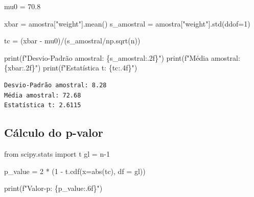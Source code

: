 \documentclass[
  letterpaper,
  DIV=11,
  numbers=noendperiod]{scrreprt}
\newenvironment{Shaded}{\begin{snugshade}}{\end{snugshade}}
\newcommand{\BuiltInTok}[1]{\textcolor[rgb]{0.00,0.23,0.31}{#1}}
\newcommand{\DecValTok}[1]{\textcolor[rgb]{0.68,0.00,0.00}{#1}}
\newcommand{\FloatTok}[1]{\textcolor[rgb]{0.68,0.00,0.00}{#1}}
\newcommand{\ImportTok}[1]{\textcolor[rgb]{0.00,0.46,0.62}{#1}}
\newcommand{\NormalTok}[1]{\textcolor[rgb]{0.00,0.23,0.31}{#1}}
\newcommand{\OperatorTok}[1]{\textcolor[rgb]{0.37,0.37,0.37}{#1}}
\newcommand{\SpecialCharTok}[1]{\textcolor[rgb]{0.37,0.37,0.37}{#1}}
\newcommand{\SpecialStringTok}[1]{\textcolor[rgb]{0.13,0.47,0.30}{#1}}
\newcommand{\StringTok}[1]{\textcolor[rgb]{0.13,0.47,0.30}{#1}}
\begin{document}
\begin{Shaded}
\begin{Highlighting}[]
\NormalTok{mu0 }\OperatorTok{=} \FloatTok{70.8} 

\NormalTok{xbar }\OperatorTok{=}\NormalTok{ amostra[}\StringTok{"weight"}\NormalTok{].mean() }
\NormalTok{s\_amostral }\OperatorTok{=}\NormalTok{ amostra[}\StringTok{"weight"}\NormalTok{].std(ddof}\OperatorTok{=}\DecValTok{1}\NormalTok{)}

\NormalTok{tc }\OperatorTok{=}\NormalTok{ (xbar }\OperatorTok{{-}}\NormalTok{ mu0)}\OperatorTok{/}\NormalTok{(s\_amostral}\OperatorTok{/}\NormalTok{np.sqrt(n)) }

\BuiltInTok{print}\NormalTok{(}\SpecialStringTok{f"Desvio{-}Padrão amostral: }\SpecialCharTok{\{}\NormalTok{s\_amostral}\SpecialCharTok{:.2f\}}\SpecialStringTok{"}\NormalTok{)}
\BuiltInTok{print}\NormalTok{(}\SpecialStringTok{f"Média amostral: }\SpecialCharTok{\{}\NormalTok{xbar}\SpecialCharTok{:.2f\}}\SpecialStringTok{"}\NormalTok{) }
\BuiltInTok{print}\NormalTok{(}\SpecialStringTok{f"Estatística t: }\SpecialCharTok{\{}\NormalTok{tc}\SpecialCharTok{:.4f\}}\SpecialStringTok{"}\NormalTok{)}
\end{Highlighting}
\end{Shaded}

\begin{verbatim}
Desvio-Padrão amostral: 8.28
Média amostral: 72.68
Estatística t: 2.6115
\end{verbatim}

\subsection{Cálculo do p-valor}\label{cuxe1lculo-do-p-valor-1}

\begin{Shaded}
\begin{Highlighting}[]
\ImportTok{from}\NormalTok{ scipy.stats }\ImportTok{import}\NormalTok{ t}
\NormalTok{gl }\OperatorTok{=}\NormalTok{ n}\OperatorTok{{-}}\DecValTok{1}

\NormalTok{p\_value }\OperatorTok{=} \DecValTok{2} \OperatorTok{*}\NormalTok{ (}\DecValTok{1} \OperatorTok{{-}}\NormalTok{ t.cdf(x}\OperatorTok{=}\BuiltInTok{abs}\NormalTok{(tc), df }\OperatorTok{=}\NormalTok{ gl))}

\BuiltInTok{print}\NormalTok{(}\SpecialStringTok{f"Valor{-}p: }\SpecialCharTok{\{}\NormalTok{p\_value}\SpecialCharTok{:.6f\}}\SpecialStringTok{"}\NormalTok{)}
\end{Highlighting}
\end{Shaded}
\end{document}
